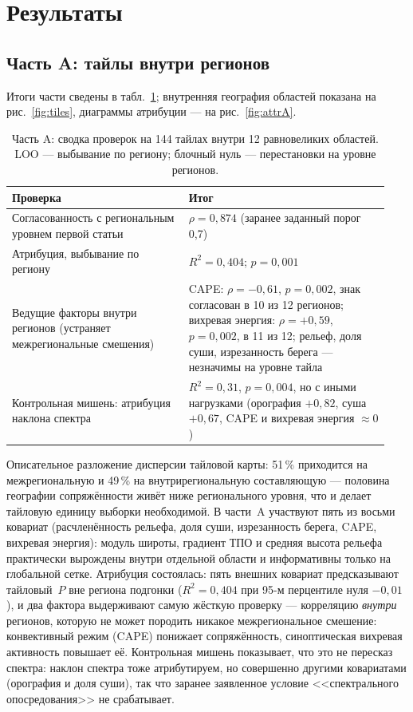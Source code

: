 \documentclass[11pt,a4paper]{article}
\begin{document}
\section{Результаты}
\label{sec:results}

\subsection{Часть A: тайлы внутри регионов}
\label{sec:armA}

Итоги части сведены в табл.~\ref{tab:armA}; внутренняя география областей показана на рис.~\ref{fig:tiles}, диаграммы атрибуции --- на рис.~\ref{fig:attrA}.

\begin{table}[t]
\centering
\caption{Часть A: сводка проверок на 144 тайлах внутри 12 равновеликих областей. LOO --- выбывание по региону; блочный нуль --- перестановки на уровне регионов.}
\label{tab:armA}
\small
\begin{tabular}{@{}p{0.44\linewidth}p{0.50\linewidth}@{}}
\toprule
Проверка & Итог\\
\midrule
Согласованность с региональным уровнем первой статьи & $\rho=0{,}874$ (заранее заданный порог 0,7)\\
Атрибуция, выбывание по региону & $R^2=0{,}404$; $p=0{,}001$\\
Ведущие факторы внутри регионов (устраняет межрегиональные смешения) & CAPE: $\rho=-0{,}61$, $p=0{,}002$, знак согласован в 10 из 12 регионов; вихревая энергия: $\rho=+0{,}59$, $p=0{,}002$, в 11 из 12; рельеф, доля суши, изрезанность берега --- незначимы на уровне тайла\\
Контрольная мишень: атрибуция наклона спектра & $R^2=0{,}31$, $p=0{,}004$, но с иными нагрузками (орография $+0{,}82$, суша $+0{,}67$, CAPE и вихревая энергия $\approx0$)\\
\bottomrule
\end{tabular}
\end{table}

Описательное разложение дисперсии тайловой карты: 51\,\% приходится на межрегиональную и 49\,\% на внутрирегиональную составляющую --- половина географии сопряжённости живёт ниже регионального уровня, что и делает тайловую единицу выборки необходимой. В части~A участвуют пять из восьми ковариат (расчленённость рельефа, доля суши, изрезанность берега, CAPE, вихревая энергия): модуль широты, градиент ТПО и средняя высота рельефа практически вырождены внутри отдельной области и информативны только на глобальной сетке. Атрибуция состоялась: пять внешних ковариат предсказывают тайловый~$P$ вне региона подгонки ($R^2=0{,}404$ при 95-м перцентиле нуля $-0{,}01$), и два фактора выдерживают самую жёсткую проверку --- корреляцию \emph{внутри} регионов, которую не может породить никакое межрегиональное смешение: конвективный режим (CAPE) понижает сопряжённость, синоптическая вихревая активность повышает её. Контрольная мишень показывает, что это не пересказ спектра: наклон спектра тоже атрибутируем, но совершенно другими ковариатами (орография и доля суши), так что заранее заявленное условие <<спектрального опосредования>> не срабатывает.
\end{document}
